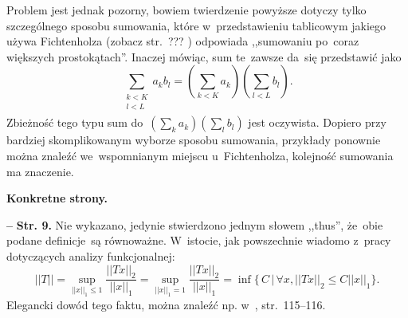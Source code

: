 \documentclass[a4paper,11pt]{article}
\newcommand{\spaceTwo}{2em}
\newcommand{\spaceFour}{0.5em}
\newcommand{\tb}{\textbf}
\newcommand{\noi}{\noindent}
\newcommand{\tb}{\textbf}
\newcommand{\noi}{\noindent}
\newcommand{\start}{\noi \tb{--} {}}
\newcommand{\Str}[1]{\tb{Str. #1.}}
\newcommand{\fr}{\frac}
\newcommand{\norm}[1]{\left|\left| #1 \right|\right|}
\newcommand{\Sum}{\sum\limits}
\begin{document}
Problem jest jednak pozorny, bowiem twierdzenie powyższe dotyczy tylko
szczególnego sposobu sumowania, które w~przedstawieniu tablicowym
jakiego używa Fichtenholza (zobacz str.~??? \cite{Fichtenholz05a})
odpowiada ,,sumowaniu po~coraz większych prostokątach''. Inaczej
mówiąc, sum te~zawsze da~się przedstawić jako
\begin{equation*}
  \Sum_{ \substack{ k < K \\ l < L \\ } } a_{ k } b_{ l }
  = ( \Sum_{ k < K } a_{ k } ) ( \Sum_{ l < L } b_{ l } ).
\end{equation*}
Zbieżność tego typu sum
do~$( \sum_{ k } a_{ k } ) ( \sum_{ l } b_{ l } )$ jest oczywista.
Dopiero przy bardziej skomplikowanym wyborze sposobu sumowania,
przykłady ponownie można znaleźć we~wspomnianym miejscu
u~Fichtenholza, kolejność sumowania ma znaczenie. %

\vspace{\spaceTwo}




\noi \tb{Konkretne strony.}

\vspace{\spaceFour}



\start \Str{9} Nie wykazano, jedynie stwierdzono jednym słowem
,,thus'', że~obie podane definicje~są równoważne. W~istocie, jak
powszechnie wiadomo z~pracy dotyczących analizy funkcjonalnej:
\begin{equation*}
  \norm{ T } = \sup_{ \norm{ x }_{ 1 } \leq 1 } \fr{ \norm{ T x }_{ 2 } }
  { \norm{ x }_{ 1 } }
  = \sup_{ \norm{ x }_{ 1 } = 1 } \fr{ \norm{ T x }_{ 2 } }
  { \norm{ x }_{ 1 } } = \inf \{ \, C \, | \, \forall x,
  \norm{ T x }_{ 2 } \leq C \norm{ x }_{ 1 } \}.
\end{equation*}
Elegancki dowód tego faktu, można znaleźć np.
w~\cite{ChmielinskiAnalizaFunkcjonalna04},
str.~115--116. %

\vspace{\spaceFour}
\end{document}
